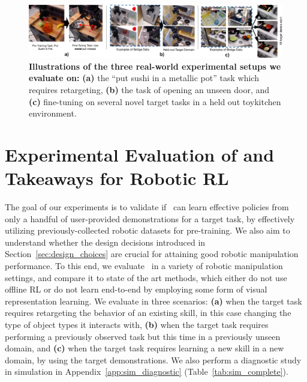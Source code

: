 \begin{figure}
\centering
  \includegraphics[width=0.8\linewidth]{chapters/ptr/scenarios_overview.pdf}
  \caption{\footnotesize{\textbf{Illustrations of the three real-world experimental setups we evaluate \ptrmethodname on:} \textbf{(a)} the ``put sushi in a metallic pot'' task which requires retargeting, \textbf{(b)} the task of opening an unseen door, and \textbf{(c)} fine-tuning on several novel target tasks in a held out toykitchen environment.}}
  \vspace{-0.6cm}
  \label{fig:experiments}
\end{figure}


\vspace{0.1cm}
\section{Experimental Evaluation of \ptrmethodname and Takeaways for Robotic RL}
\label{sec:result}
\vspace{0.1cm}
The goal of our experiments is to validate if \ptrmethodname\ can learn effective policies from only a handful of user-provided demonstrations for a target task, by effectively utilizing previously-collected robotic datasets for pre-training. We also aim to understand whether the design decisions introduced in Section~\ref{sec:design_choices} are crucial for attaining good robotic manipulation performance. To this end, we evaluate \ptrmethodname\ in a variety of robotic manipulation settings, and compare it to state of the art methods, which either do not use offline RL or do not learn end-to-end by employing some form of visual representation learning. We evaluate in three scenarios: \textbf{(a)} when the target task requires retargeting the behavior of an existing skill, in this case changing the type of object types it interacts with, \textbf{(b)} when the target task requires performing a previously observed task but this time in a previously unseen domain, and \textbf{(c)} when the target task requires learning a new skill in a new domain, by using the target demonstrations. We also perform a diagnostic study in simulation in Appendix~\ref{app:sim_diagnostic} (Table~\ref{tab:sim_complete}). 


